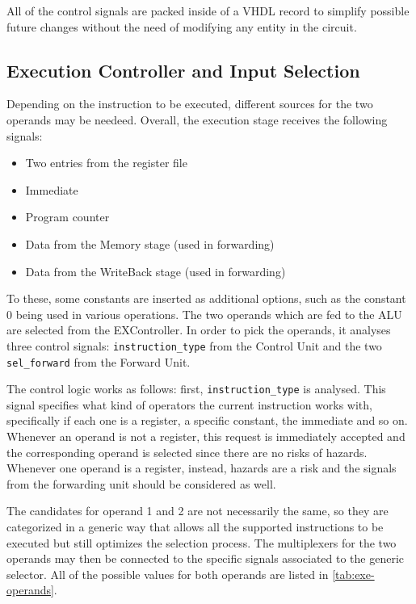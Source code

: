 All of the control signals are packed inside of a VHDL record to simplify possible future changes without the need of
modifying any entity in the circuit.

\subsection{Execution Controller and Input Selection}
Depending on the instruction to be executed, different sources for the two operands may be needeed. Overall, the
execution stage receives the following signals:
\begin{itemize}
    \item Two entries from the register file
    \item Immediate
    \item Program counter
    \item Data from the Memory stage (used in forwarding)
    \item Data from the WriteBack stage (used in forwarding)
\end{itemize}
To these, some constants are inserted as additional options, such as the constant 0 being used in various operations.
The two operands which are fed to the ALU are selected from the EXController. In order to
pick the operands, it analyses three control signals: \texttt{instruction\_type} from the Control Unit and the two
\texttt{sel\_forward} from the Forward Unit.

The control logic works as follows: first, \texttt{instruction\_type} is analysed. This signal specifies what kind of
operators the current instruction works with, specifically if each one is a register, a specific constant,
the immediate and so on.
Whenever an operand is not a register, this request is immediately accepted and the corresponding
operand is selected since there are no risks of hazards. Whenever one operand is a register, instead, hazards are
a risk and the signals from the forwarding unit should be considered as well.

The candidates for operand 1 and 2 are not necessarily the same, so they are categorized in a generic way that allows
all the supported instructions to be executed but still optimizes the selection process. The multiplexers for the two
operands may then be connected to the specific signals associated to the generic selector.
All of the possible values for both operands are listed in \autoref{tab:exe-operands}.

